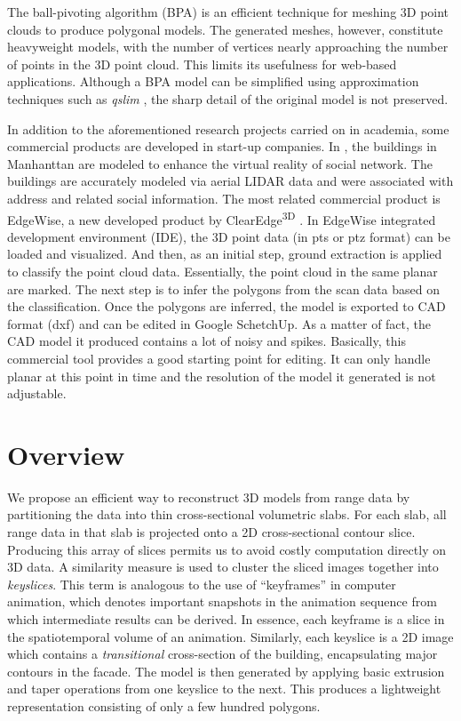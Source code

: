 The ball-pivoting algorithm (BPA) \cite{BPA_BMRS} is an efficient technique
for meshing 3D point clouds to produce polygonal models.
The generated meshes, however, constitute heavyweight models,
with the number of vertices nearly approaching the number of points in the
3D point cloud.
This limits its usefulness for web-based applications.
Although a BPA model can be simplified using approximation techniques such as
{\it qslim} \cite{BPA_GH}, the sharp detail of the original model is not
preserved.

In addition to the aforementioned research projects carried on in academia, 
some commercial products are developed in start-up companies. 
In \cite{IND_YC}, the buildings in Manhanttan are modeled to enhance
the virtual reality of social network. The buildings are accurately modeled via
aerial LIDAR data and were associated with address and related social information.
The most related commercial product is EdgeWise\textsuperscript{\texttrademark}, 
a new developed product by ClearEdge\textsuperscript{3D} \cite{IND_EW}.
In EdgeWise integrated development environment (IDE), the 3D point data 
(in pts or ptz format) can be loaded and visualized. And then, as an initial step,
ground extraction is applied to classify the point cloud data. 
Essentially, the point cloud in the same planar are marked. 
The next step is to infer the polygons from the scan data based on the classification. 
Once the polygons are inferred, the model is
exported to CAD format (dxf) and can be edited in Google SchetchUp. 
As a matter of fact, the CAD model it produced contains a lot of noisy and spikes. 
Basically, this commercial tool provides a good starting point for editing. 
It can only handle planar at this point in time and 
the resolution of the model it generated is not adjustable.


\section{Overview}

We propose an efficient way to reconstruct 3D models from range data by
partitioning the data into thin cross-sectional volumetric slabs.
For each slab, all range data in that slab is projected onto a 2D
cross-sectional contour slice.
Producing this array of slices permits us to avoid costly computation directly
on 3D data.
A similarity measure \cite{IR_Brown, IR_ZF, RE_WWLZ} is used to 
cluster the sliced images together into {\it keyslices}.
This term is analogous to the use of ``keyframes'' in computer animation,
which denotes important snapshots in the animation sequence from which
intermediate results can be derived.
In essence, each keyframe is a slice in the spatiotemporal volume of
an animation.
Similarly, each keyslice is a 2D image which contains a {\it transitional}
cross-section of the building, encapsulating major contours in the facade.
The model is then generated by applying basic extrusion and taper
operations from one keyslice to the next.
This produces a lightweight representation consisting of only a few
hundred polygons.

